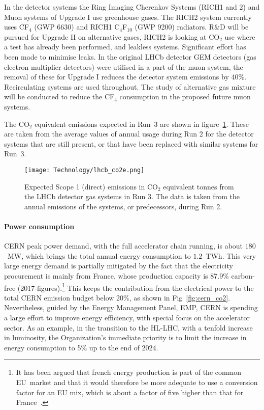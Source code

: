 \documentclass[../SustainableHEP.tex]{subfiles}
\begin{document}
\begin{casestudy}
In the detector systems the Ring Imaging Cherenkov Systems (RICH1 and 2) and Muon systems of Upgrade I use greenhouse gases. The RICH2 system currently uses CF$_4$ (GWP 6630) and RICH1 C$_4$F$_{10}$ (GWP 9200) radiators. R\&D will be pursued for Upgrade II on alternative gases, RICH2 is looking at CO$_2$ use where a test has already been performed, and leakless systems. Significant effort has been made to minimise leaks.  
In the original LHCb detector GEM detectors (gas electron multiplier detectors) were utilised in a part of the muon system, the removal of these for Upgrade I reduces the detector system emissions by 40\%. 
Recirculating systems are used throughout. The study of alternative gas mixture will be conducted to reduce the CF$_4$ consumption in the proposed future muon systems.

The CO$_2$ equivalent emissions expected in Run~3 are shown in figure~\ref{fig:LHCbCO2e}. These are taken from the average values of annual usage during Run 2 for the detector systems that are still present, or that have been replaced with similar systems for Run~3. 

\begin{figure}
    \texttt{[image: Technology/lhcb\_co2e.png]}
    \caption[Expected Scope 1 (direct)  emissions in CO$_2$ equivalent tonnes from the LHCb detector gas systems in Run 3]{Expected Scope 1 (direct)  emissions in CO$_2$ equivalent tonnes from the LHCb detector gas systems in Run 3. The data is taken from the annual emissions of the systems, or predecessors, during Run 2.}\label{fig:LHCbCO2e}
\end{figure}

\paragraph{Power consumption}   %
\label{sec:powerconsumption}
CERN peak power demand, with the full accelerator chain running, is about $180$~MW, which brings the total annual energy consumption to $1.2$~TWh. This very large energy demand is partially mitigated by the fact that the electricity procurement is mainly from France, whose production capacity is 87.9$\%$ carbon-free (2017-figures).\footnote{It has been argued that french energy production is part of the common EU~market and that it would therefore be more adequate to use a conversion factor for an EU mix, which is about a factor of five higher than that for France~\cite{EUmix}.} This keeps the contribution from the electrical power to the total CERN emission budget below 20$\%$, as shown in Fig~\ref{fig:cern_co2}. Nevertheless, guided by the Energy Management Panel, EMP, CERN is spending a large effort to improve energy efficiency, with special focus on the accelerator sector. As an example, in the transition to the HL-LHC, with a tenfold increase in luminosity, the Organization’s immediate priority is to limit the increase in energy consumption to 5$\%$ up to the end of 2024.
 

\end{casestudy}
\end{document}
